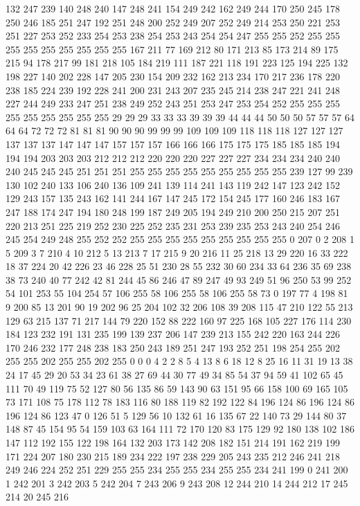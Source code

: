 132 247 239 140 248 240 147 248 241 154 249 242 162 249 244 170 250 245 178 250 246 185 251 247 192 251 248 200 252 249 207 252 249 214 253 250 221 253 251 227 253 252 233 254 253 238 254 253 243 254 254 247 255 255 252 255 255 255 255 255 255 255 255 255 167 211 77 169 212 80 171 213 85 173 214 89 175 215 94 178 217 99 181 218 105 184 219 111 187 221 118 191 223 125 194 225 132 198 227 140 202 228 147 205 230 154 209 232 162 213 234 170 217 236 178 220 238 185 224 239 192 228 241 200 231 243 207 235 245 214 238 247 221 241 248 227 244 249 233 247 251 238 249 252 243 251 253 247 253 254 252 255 255 255 255 255 255 255 255 255 29 29 29 33 33 33 39 39 39 44 44 44 50 50 50 57 57 57 64 64 64 72 72 72 81 81 81 90 90 90 99 99 99 109 109 109 118 118 118 127 127 127 137 137 137 147 147 147 157 157 157 166 166 166 175 175 175 185 185 185 194 194 194 203 203 203 212 212 212 220 220 220 227 227 227 234 234 234 240 240 240 245 245 245 251 251 251 255 255 255 255 255 255 255 255 255 
239 127 99 239 130 102 240 133 106 240 136 109 241 139 114 241 143 119 242 147 123 242 152 129 243 157 135 243 162 141 244 167 147 245 172 154 245 177 160 246 183 167 247 188 174 247 194 180 248 199 187 249 205 194 249 210 200 250 215 207 251 220 213 251 225 219 252 230 225 252 235 231 253 239 235 253 243 240 254 246 245 254 249 248 255 252 252 255 255 255 255 255 255 255 255 255 0 207 0 2 208 1 5 209 3 7 210 4 10 212 5 13 213 7 17 215 9 20 216 11 25 218 13 29 220 16 33 222 18 37 224 20 42 226 23 46 228 25 51 230 28 55 232 30 60 234 33 64 236 35 69 238 38 73 240 40 77 242 42 81 244 45 86 246 47 89 247 49 93 249 51 96 250 53 99 252 54 101 253 55 104 254 57 106 255 58 106 255 58 106 255 58 73 0 197 77 4 198 81 9 200 85 13 201 90 19 202 96 25 204 102 32 206 108 39 208 115 47 210 122 55 213 129 63 215 137 71 217 144 79 220 152 88 222 160 97 225 168 105 227 176 114 230 184 123 232 191 131 235 199 139 237 206 147 239 213 
155 242 220 163 244 226 170 246 232 177 248 238 183 250 243 189 251 247 193 252 251 198 254 255 202 255 255 202 255 255 202 255 0 0 0 4 2 2 8 5 4 13 8 6 18 12 8 25 16 11 31 19 13 38 24 17 45 29 20 53 34 23 61 38 27 69 44 30 77 49 34 85 54 37 94 59 41 102 65 45 111 70 49 119 75 52 127 80 56 135 86 59 143 90 63 151 95 66 158 100 69 165 105 73 171 108 75 178 112 78 183 116 80 188 119 82 192 122 84 196 124 86 196 124 86 196 124 86 123 47 0 126 51 5 129 56 10 132 61 16 135 67 22 140 73 29 144 80 37 148 87 45 154 95 54 159 103 63 164 111 72 170 120 83 175 129 92 180 138 102 186 147 112 192 155 122 198 164 132 203 173 142 208 182 151 214 191 162 219 199 171 224 207 180 230 215 189 234 222 197 238 229 205 243 235 212 246 241 218 249 246 224 252 251 229 255 255 234 255 255 234 255 255 234 241 199 0 241 200 1 242 201 3 242 203 5 242 204 7 243 206 9 243 208 12 244 210 14 244 212 17 245 214 20 245 216 
